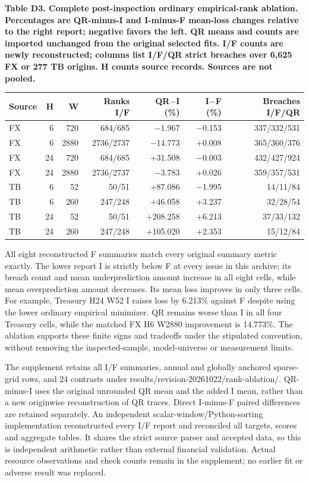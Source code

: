 \documentclass[10pt,a4paper]{article}
\begin{document}
\begin{center}
\begin{minipage}{\linewidth}
\small\textbf{Table D3. Complete post-inspection ordinary empirical-rank ablation. Percentages are QR-minus-I and I-minus-F mean-loss changes relative to the right report; negative favors the left. QR means and counts are imported unchanged from the original selected fits. I/F counts are newly reconstructed; columns list I/F/QR strict breaches over 6,625 FX or 277 TB origins. H counts source records. Sources are not pooled.}\par\medskip
\centering\fontsize{8}{10}\selectfont
\begin{tabular}{lrrrrrr}
\toprule
Source & H & W & Ranks I/F & QR\(-\)I (\%) & I\(-\)F (\%) & Breaches I/F/QR \\
\midrule
FX & 6 & 720 & 684/685 & \(-\)1.967 & \(-\)0.153 & 337/332/531 \\
FX & 6 & 2880 & 2736/2737 & \(-\)14.773 & +0.008 & 365/360/376 \\
FX & 24 & 720 & 684/685 & +31.508 & \(-\)0.003 & 432/427/924 \\
FX & 24 & 2880 & 2736/2737 & \(-\)3.783 & +0.026 & 359/357/531 \\
TB & 6 & 52 & 50/51 & +87.086 & \(-\)1.995 & 14/11/84 \\
TB & 6 & 260 & 247/248 & +46.058 & +3.237 & 32/28/54 \\
TB & 24 & 52 & 50/51 & +208.258 & +6.213 & 37/33/132 \\
TB & 24 & 260 & 247/248 & +105.020 & +2.353 & 15/12/84 \\
\bottomrule
\end{tabular}
\end{minipage}
\end{center}
All eight reconstructed F summaries match every original summary metric exactly. The lower report I is strictly below F at every issue in this archive; its breach count and mean underprediction amount increase in all eight cells, while mean overprediction amount decreases. Its mean loss improves in only three cells. For example, Treasury H24 W52 I raises loss by 6.213\% against F despite using the lower ordinary empirical minimizer. QR remains worse than I in all four Treasury cells, while the matched FX H6 W2880 improvement is 14.773\%. The ablation supports these finite signs and tradeoffs under the stipulated convention, without removing the inspected-sample, model-universe or measurement limits.

The supplement retains all I/F summaries, annual and globally anchored sparse-grid rows, and 24 contrasts under results/revision-20261022/rank-ablation/. QR-minus-I uses the original unrounded QR mean and the added I mean, rather than a new originwise reconstruction of QR traces. Direct I-minus-F paired differences are retained separately. An independent scalar-window/Python-sorting implementation reconstructed every I/F report and reconciled all targets, scores and aggregate tables. It shares the strict source parser and accepted data, so this is independent arithmetic rather than external financial validation. Actual resource observations and check counts remain in the supplement; no earlier fit or adverse result was replaced.
\end{document}
